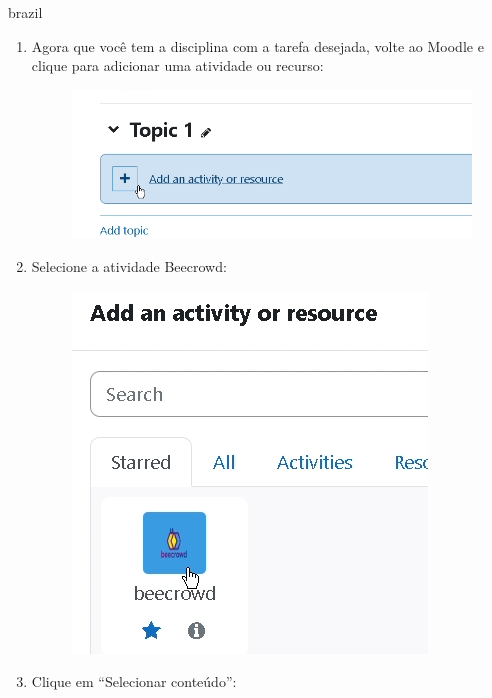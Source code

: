 \begin{otherlanguage*}{brazil}
\begin{enumerate}
    \item Agora que você tem a disciplina com a tarefa desejada, volte ao Moodle e clique para adicionar uma atividade ou recurso:

    \begin{figure}[H]
        \centering
            \includegraphics[scale=0.3]{pictures/apendices/apendice_b_10.png}
    \end{figure}

    \item Selecione a atividade Beecrowd:

    \begin{figure}[H]
        \centering
            \includegraphics[scale=0.4]{pictures/apendices/apendice_b_11.png}
    \end{figure}

    \item Clique em “Selecionar conteúdo”:


\end{enumerate}
\end{otherlanguage*}
